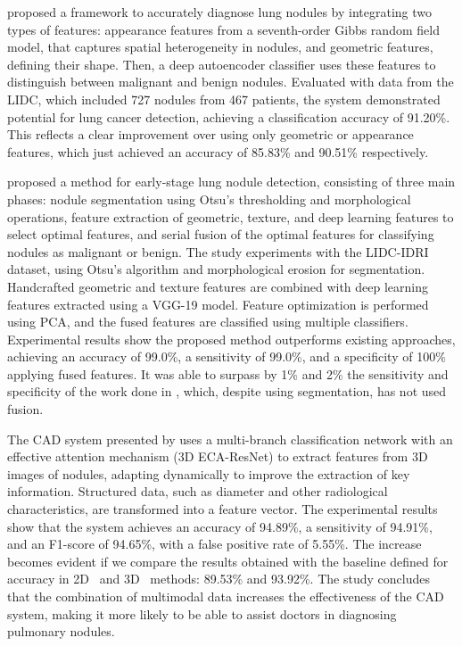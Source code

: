 \citet{shaffie_generalized_2018} proposed a framework to accurately diagnose lung nodules by integrating two types of features: appearance features from a seventh-order Gibbs random field model, that captures spatial heterogeneity in nodules, and geometric features, defining their shape. Then, a deep autoencoder classifier uses these features to distinguish between malignant and benign nodules. Evaluated with data from the LIDC, which included 727 nodules from 467 patients, the system demonstrated potential for lung cancer detection, achieving a classification accuracy of 91.20\%. This reflects a clear improvement over using only geometric or appearance features, which just achieved an accuracy of 85.83\% and 90.51\% respectively.

\citet{saba_lung_2019} proposed a method for early-stage lung nodule detection, consisting of three main phases: nodule segmentation using Otsu's thresholding and morphological operations, feature extraction of geometric, texture, and deep learning features to select optimal features, and serial fusion of the optimal features for classifying nodules as malignant or benign. The study experiments with the LIDC-IDRI dataset, using Otsu's algorithm and morphological erosion for segmentation. Handcrafted geometric and texture features are combined with deep learning features extracted using a VGG-19 model. Feature optimization is performed using PCA, and the fused features are classified using multiple classifiers. Experimental results show the proposed method outperforms existing approaches, achieving an accuracy of 99.0\%,  a sensitivity of 99.0\%, and a specificity of 100\% applying fused features. It was able to surpass by 1\% and 2\% the sensitivity and specificity of the work done in \cite{naqi_multistage_2018}, which, despite using segmentation, has not used fusion.

The CAD system presented by \citet{yuan_multi-modal_2023} uses a multi-branch classification network with an effective attention mechanism (3D ECA-ResNet) to extract features from 3D images of nodules, adapting dynamically to improve the extraction of key information. Structured data, such as diameter and other radiological characteristics, are transformed into a feature vector. The experimental results show that the system achieves an accuracy of 94.89\%, a sensitivity of 94.91\%, and an F1-score of 94.65\%, with a false positive rate of 5.55\%. The increase becomes evident if we compare the results obtained with the baseline defined for accuracy in 2D~\cite{xie_fusing_2018} and 3D~\cite{zhao_combining_2020} methods: 	
89.53\% and 93.92\%. The study concludes that the combination of multimodal data increases the effectiveness of the CAD system, making it more likely to be able to assist doctors in diagnosing pulmonary nodules.


